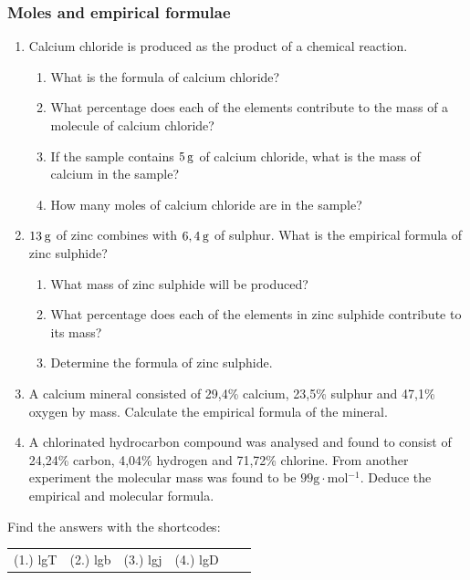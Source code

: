             \subsubsection{  Moles and empirical formulae
      }
            \nopagebreak
      \label{m38712*id281924}\begin{enumerate}[noitemsep, label=\textbf{\arabic*}. ] 
            \label{m38712*uid73}\item Calcium chloride is produced as the product of a chemical reaction.
\label{m38712*id281940}\begin{enumerate}[noitemsep, label=\textbf{\alph*}. ] 
            \label{m38712*uid74}\item What is the formula of calcium chloride?
\label{m38712*uid75}\item What percentage does each of the elements contribute to the mass of a molecule of calcium chloride?
\label{m38712*uid76}\item If the sample contains $5\phantom{\rule{2pt}{0ex}}\mathrm{g}$ of calcium chloride, what is the mass of calcium in the sample?
\label{m38712*uid77}\item How many moles of calcium chloride are in the sample?
\end{enumerate}
                \label{m38712*uid78}\item $13\phantom{\rule{2pt}{0ex}}\mathrm{g}$ of zinc combines with $6,4\phantom{\rule{2pt}{0ex}}\mathrm{g}$ of sulphur. What is the empirical formula of zinc sulphide?
\label{m38712*id282007}\begin{enumerate}[noitemsep, label=\textbf{\alph*}. ] 
            \label{m38712*uid79}\item What mass of zinc sulphide will be produced?
\label{m38712*uid80}\item What percentage does each of the elements in zinc sulphide contribute to its mass?
\label{m38712*uid81}\item Determine the formula of zinc sulphide.
\end{enumerate}
                \label{m38712*uid82}\item A calcium mineral consisted of 29,4\% calcium, 23,5\% sulphur and 47,1\% oxygen by mass. Calculate the empirical formula of the mineral.\newline
\label{m38712*uid83}\item A chlorinated hydrocarbon compound was analysed and found to consist of 24,24\% carbon, 4,04\% hydrogen and 71,72\% chlorine. From another experiment the molecular mass was found to be $99\mathrm{g}\ensuremath{\cdot}\mathrm{mol}{}^{-1}$. Deduce the empirical and molecular formula.\newline
\end{enumerate}
    \label{m38712*cid7}
\par {} Find the answers with the shortcodes:
 \par \begin{tabular}[h]{cccccc}
 (1.) lgT  &  (2.) lgb  &  (3.) lgj  &  (4.) lgD  & \end{tabular}
